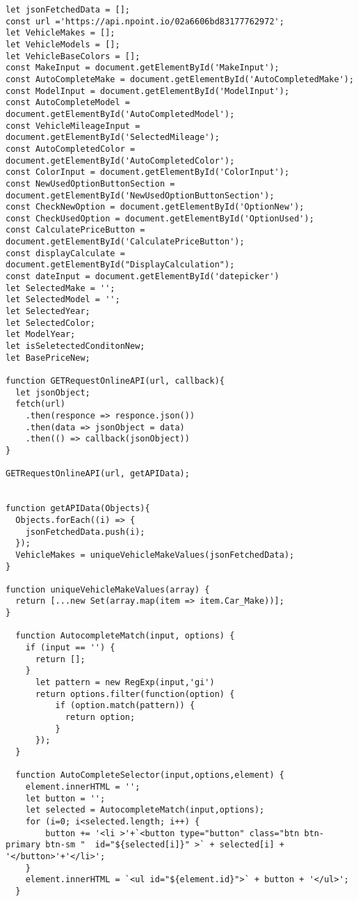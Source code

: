 \makeatletter
\makeatother
\begin{lstlisting}[style=htmlcssjs]
let jsonFetchedData = [];
const url ='https://api.npoint.io/02a6606bd83177762972'; 
let VehicleMakes = [];
let VehicleModels = [];
let VehicleBaseColors = [];
const MakeInput = document.getElementById('MakeInput');
const AutoCompleteMake = document.getElementById('AutoCompletedMake');
const ModelInput = document.getElementById('ModelInput');
const AutoCompleteModel = document.getElementById('AutoCompletedModel');
const VehicleMileageInput = document.getElementById('SelectedMileage');
const AutoCompletedColor = document.getElementById('AutoCompletedColor');
const ColorInput = document.getElementById('ColorInput');
const NewUsedOptionButtonSection = document.getElementById('NewUsedOptionButtonSection');
const CheckNewOption = document.getElementById('OptionNew');
const CheckUsedOption = document.getElementById('OptionUsed');
const CalculatePriceButton = document.getElementById('CalculatePriceButton');
const displayCalculate = document.getElementById("DisplayCalculation");
const dateInput = document.getElementById('datepicker')
let SelectedMake = '';
let SelectedModel = '';
let SelectedYear;
let SelectedColor;
let ModelYear;
let isSeletectedConditonNew;
let BasePriceNew;

function GETRequestOnlineAPI(url, callback){
  let jsonObject;
  fetch(url)
    .then(responce => responce.json())
    .then(data => jsonObject = data)
    .then(() => callback(jsonObject))
}

GETRequestOnlineAPI(url, getAPIData);


function getAPIData(Objects){
  Objects.forEach((i) => {
    jsonFetchedData.push(i);
  });
  VehicleMakes = uniqueVehicleMakeValues(jsonFetchedData);
}

function uniqueVehicleMakeValues(array) {
  return [...new Set(array.map(item => item.Car_Make))];
} 

  function AutocompleteMatch(input, options) {
    if (input == '') {
      return [];
    }
      let pattern = new RegExp(input,'gi')
      return options.filter(function(option) {
          if (option.match(pattern)) {
            return option;
          }
      });
  }

  function AutoCompleteSelector(input,options,element) {
    element.innerHTML = '';
    let button = '';
    let selected = AutocompleteMatch(input,options);
    for (i=0; i<selected.length; i++) {
        button += '<li >'+`<button type="button" class="btn btn-primary btn-sm "  id="${selected[i]}" >` + selected[i] + '</button>'+'</li>';   
    }
    element.innerHTML = `<ul id="${element.id}">` + button + '</ul>';
  }


\end{lstlisting}
